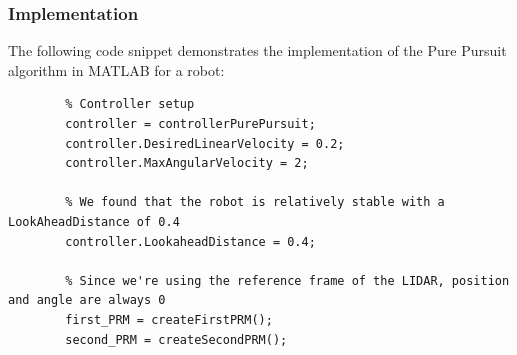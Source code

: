 \documentclass{article}
\begin{document}
	\subsubsection*{Implementation}
	The following code snippet demonstrates the implementation of the Pure Pursuit algorithm in MATLAB for a robot:
	\begin{verbatim}
		% Controller setup
		controller = controllerPurePursuit;
		controller.DesiredLinearVelocity = 0.2;
		controller.MaxAngularVelocity = 2;
		
		% We found that the robot is relatively stable with a LookAheadDistance of 0.4
		controller.LookaheadDistance = 0.4;
		
		% Since we're using the reference frame of the LIDAR, position and angle are always 0
		first_PRM = createFirstPRM();
		second_PRM = createSecondPRM();
	\end{verbatim}
	
\end{document}
